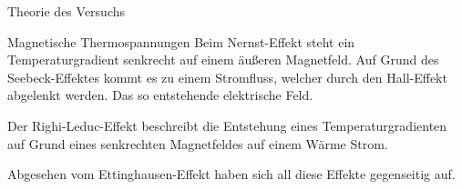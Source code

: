 \documentclass[pdftex, a4paper,11pt, twoside, ngerman]{report}
\begin{document}
\begin{chapter}{Theorie des Versuchs}
\begin{section}{Magnetische Thermospannungen}
                Beim Nernst-Effekt steht ein Temperaturgradient senkrecht auf einem äußeren Magnetfeld.
                Auf Grund des Seebeck-Effektes kommt es zu einem Stromfluss, welcher durch den Hall-Effekt abgelenkt werden.
                Das so entstehende elektrische Feld.


                Der Righi-Leduc-Effekt beschreibt die Entstehung eines Temperaturgradienten auf Grund eines senkrechten Magnetfeldes auf einem Wärme Strom.

                Abgesehen vom Ettinghausen-Effekt haben sich all diese Effekte gegenseitig auf.

        \end{section}
    
    
  \end{chapter}
         
         
         
\end{document}
